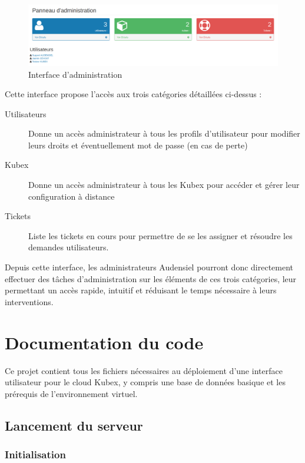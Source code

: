 \documentclass[a4paper]{report}
\begin{document}
\begin{figure}[h!]
	\includegraphics[width=\textwidth]{images/pageAdmin.png}
	\caption{\label{fig:admin} Interface d'administration}
\end{figure}

Cette interface propose l'accès aux trois catégories détaillées ci-dessus :

\begin{description}
	\item[Utilisateurs] Donne un accès administrateur à tous les profils d'utilisateur pour modifier leurs droits et éventuellement mot de passe (en cas de perte)
	\item[Kubex] Donne un accès administrateur à tous les Kubex pour accéder et gérer leur configuration à distance
	\item[Tickets] Liste les tickets en cours pour permettre de se les assigner et résoudre les demandes utilisateurs.
\end{description}

Depuis cette interface, les administrateurs Audensiel pourront donc directement effectuer des tâches d'administration sur les éléments de ces trois catégories, leur permettant un accès rapide, intuitif et réduisant le temps nécessaire à leurs interventions.

\chapter{Documentation du code}

Ce projet contient tous les fichiers nécessaires au déploiement d'une interface utilisateur pour le cloud Kubex, y compris une base de données basique et les prérequis de l'environnement virtuel.

\section{Lancement du serveur}

\subsection{Initialisation}
\end{document}
